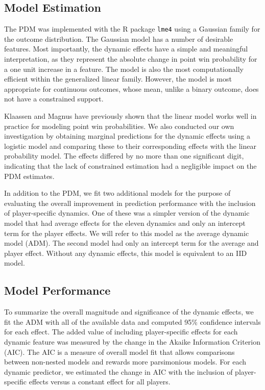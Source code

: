 \documentclass{Latex/svjour3}
\begin{document}


\subsection{Model Estimation}

The PDM was implemented with the R package \texttt{lme4} using a Gaussian family
for the outcome distribution. The Gaussian model has a number of desirable
features. Most importantly, the dynamic effects have a simple and meaningful
interpretation, as they represent the absolute change in point win probability
for a one unit increase in a feature. The model is also the most computationally
efficient within the generalized linear family. However, the model is most
appropriate for continuous outcomes, whose mean, unlike a binary outcome, does
not have a constrained support.

Klaassen and Magnus have previously shown 
that the linear model works well in practice for modeling point win
probabilities. We also conducted our own investigation by obtaining marginal
predictions for the dynamic effects using a logistic model and comparing these
to their corresponding effects with the linear probability model. The effects
differed by no more than one significant digit, indicating that the lack of
constrained estimation had a negligible impact on the PDM estimates.

In addition to the PDM, we fit two additional models for the purpose of
evaluating the overall improvement in prediction performance with the inclusion
of player-specific dynamics. One of these was a simpler version of the dynamic
model that had average effects for the eleven dynamics and only an intercept
term for the player effects. We will refer to this model as the average dynamic
model (ADM). The second model had only an intercept term for the average and
player effect. Without any dynamic effects, this model is equivalent to an IID
model.

\subsection{Model Performance}

To summarize the overall magnitude and significance of the dynamic effects, we
fit the ADM with all of the available data and computed 95\% confidence
intervals for each effect. The added value of including player-specific effects
for each dynamic feature was measured by the change in the Akaike Information
Criterion (AIC). The AIC is a measure of overall model fit that allows
comparisons between non-nested models and rewards more parsimonious models. For
each dynamic predictor, we estimated the change in AIC with the inclusion of
player-specific effects versus a constant effect for all players.
\end{document}
